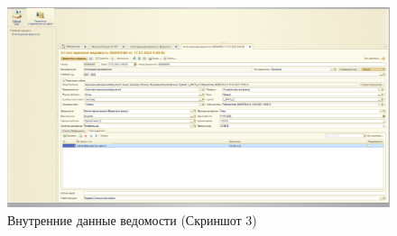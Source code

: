\documentclass[12pt,a4paper]{article}
\begin{document}
\begin{figure}[h]
 \centering
 \includegraphics[width=0.9 \textwidth]{Pic1.png}
 \caption{Внутренние данные ведомости (Скриншот 3)}\label{fig:par}
\end{figure}
\end{document}
